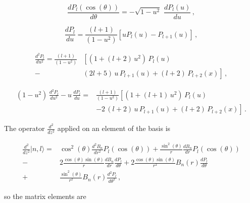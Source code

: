 \documentclass[12pt,a4paper]{article}
\newcommand{\ddz}[1]{\frac{d^2{#1}}{dz^2}}
\newcommand{\dr}[1]{\frac{d{#1}}{dr}}
\newcommand{\ddr}[1]{\frac{d^2{#1}}{dr^2}}
\newcommand{\dt}[1]{\frac{d{#1}}{d\theta}}
\newcommand{\ddt}[1]{\frac{d^2{#1}}{d\theta^2}}
\newcommand{\ct}{\cos(\theta)}
\newcommand{\cct}{\cos^2(\theta)}
\newcommand{\st}{\sin(\theta)}
\newcommand{\sst}{\sin^2(\theta)}
\begin{document}
\begin{equation}
\dt{P_l(\ct)} = -\sqrt{1-u^2}\,\, \frac{dP_l(u)}{du}\,,
\end{equation}

\begin{equation}
\frac{dP_l}{du} = \frac{(l+1)}{(1-u^2)}\left[ u P_l(u) - P_{l+1}(u)\right]\,,
\end{equation}

\begin{equation}
\begin{split}
\frac{d^2P_l}{du^2} = \frac{(l+1)}{(1-u^2)} &\left[(1+(l+2)\,u^2)\,P_l(u) \right. \\
                        -&\left.(2l+5)\,u\,P_{l+1}(u) + (l+2)\,P_{l+2}(x) \right]\,,
\end{split}
\end{equation}

\begin{equation}
\begin{split}
(1-u^2)\,\frac{d^2P_l}{du^2} - u\,\frac{dP_l}{du} =& \frac{(l+1)}{(1-u^2)} \left[(1+(l+1)\,u^2)\,P_l(u) \right. \\
                        &\left.-2\,(l+2)\,u\,P_{l+1}(u) + (l+2)\,P_{l+2}(x) \right]\,.
\end{split}
\end{equation}

The operator $\ddz{}$ applied on an element of the basis is

\begin{equation}
\begin{split}
\ddz{}|n,l\rangle =&\cct\ddr{B_n}P_l(\ct) + \frac{\sst}{r}\dr{B_n}P_l(\ct) \\
                  -&2\frac{\ct\st}{r}\dr{B_n}\dt{P_l} + 2\frac{\ct\st}{r^2}B_n(r)\dt{P_l} \\
                  +&\frac{\sst}{r^2}B_n(r)\ddt{P_l}\,,
\end{split}
\end{equation}

\noindent so the matrix elements are
\end{document}
